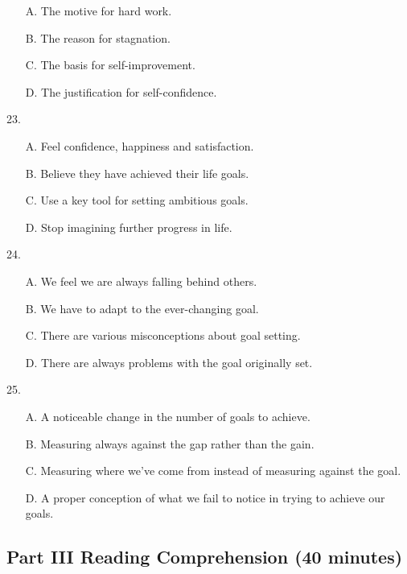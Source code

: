 \documentclass[UTF8,11pt]{ctexart}
\begin{document}
\begin{itemize}[leftmargin=2em,itemsep=.2em,topsep=.4em]\item[A.] The motive for hard work.
\item[B.] The reason for stagnation.
\item[C.] The basis for self-improvement.
\item[D.] The justification for self-confidence.
\end{itemize}

23.


\begin{itemize}[leftmargin=2em,itemsep=.2em,topsep=.4em]\item[A.] Feel confidence, happiness and satisfaction.
\item[B.] Believe they have achieved their life goals.
\item[C.] Use a key tool for setting ambitious goals.
\item[D.] Stop imagining further progress in life.
\end{itemize}

24.


\begin{itemize}[leftmargin=2em,itemsep=.2em,topsep=.4em]\item[A.] We feel we are always falling behind others.
\item[B.] We have to adapt to the ever-changing goal.
\item[C.] There are various misconceptions about goal setting.
\item[D.] There are always problems with the goal originally set.
\end{itemize}

25.


\begin{itemize}[leftmargin=2em,itemsep=.2em,topsep=.4em]\item[A.] A noticeable change in the number of goals to achieve.
\item[B.] Measuring always against the gap rather than the gain.
\item[C.] Measuring where we’ve come from instead of measuring against the goal.
\item[D.] A proper conception of what we fail to notice in trying to achieve our goals.
\end{itemize}

\subsection*{\textbf{Part III Reading Comprehension (40 minutes)}}
\end{document}
